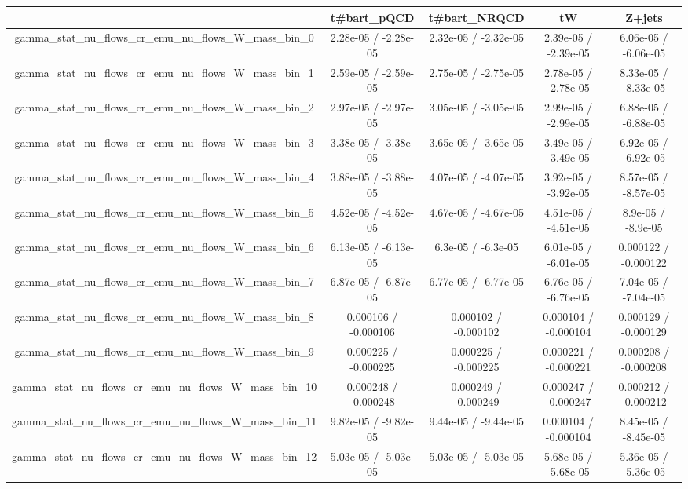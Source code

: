 \documentclass[10pt]{article}
\begin{document}
\begin{table}[htbp]
\begin{center}
\begin{tabular}{|c|c|c|c|c|}
\hline 
      & t#bar{t}_{pQCD}      & t#bar{t}_{NRQCD}      & tW      & Z+jets \\ 
\hline 
  gamma_stat_nu_flows_cr_emu_nu_flows_W_mass_bin_0 & 2.28e-05 / -2.28e-05 & 2.32e-05 / -2.32e-05 & 2.39e-05 / -2.39e-05 & 6.06e-05 / -6.06e-05 \\ 
  gamma_stat_nu_flows_cr_emu_nu_flows_W_mass_bin_1 & 2.59e-05 / -2.59e-05 & 2.75e-05 / -2.75e-05 & 2.78e-05 / -2.78e-05 & 8.33e-05 / -8.33e-05 \\ 
  gamma_stat_nu_flows_cr_emu_nu_flows_W_mass_bin_2 & 2.97e-05 / -2.97e-05 & 3.05e-05 / -3.05e-05 & 2.99e-05 / -2.99e-05 & 6.88e-05 / -6.88e-05 \\ 
  gamma_stat_nu_flows_cr_emu_nu_flows_W_mass_bin_3 & 3.38e-05 / -3.38e-05 & 3.65e-05 / -3.65e-05 & 3.49e-05 / -3.49e-05 & 6.92e-05 / -6.92e-05 \\ 
  gamma_stat_nu_flows_cr_emu_nu_flows_W_mass_bin_4 & 3.88e-05 / -3.88e-05 & 4.07e-05 / -4.07e-05 & 3.92e-05 / -3.92e-05 & 8.57e-05 / -8.57e-05 \\ 
  gamma_stat_nu_flows_cr_emu_nu_flows_W_mass_bin_5 & 4.52e-05 / -4.52e-05 & 4.67e-05 / -4.67e-05 & 4.51e-05 / -4.51e-05 & 8.9e-05 / -8.9e-05 \\ 
  gamma_stat_nu_flows_cr_emu_nu_flows_W_mass_bin_6 & 6.13e-05 / -6.13e-05 & 6.3e-05 / -6.3e-05 & 6.01e-05 / -6.01e-05 & 0.000122 / -0.000122 \\ 
  gamma_stat_nu_flows_cr_emu_nu_flows_W_mass_bin_7 & 6.87e-05 / -6.87e-05 & 6.77e-05 / -6.77e-05 & 6.76e-05 / -6.76e-05 & 7.04e-05 / -7.04e-05 \\ 
  gamma_stat_nu_flows_cr_emu_nu_flows_W_mass_bin_8 & 0.000106 / -0.000106 & 0.000102 / -0.000102 & 0.000104 / -0.000104 & 0.000129 / -0.000129 \\ 
  gamma_stat_nu_flows_cr_emu_nu_flows_W_mass_bin_9 & 0.000225 / -0.000225 & 0.000225 / -0.000225 & 0.000221 / -0.000221 & 0.000208 / -0.000208 \\ 
  gamma_stat_nu_flows_cr_emu_nu_flows_W_mass_bin_10 & 0.000248 / -0.000248 & 0.000249 / -0.000249 & 0.000247 / -0.000247 & 0.000212 / -0.000212 \\ 
  gamma_stat_nu_flows_cr_emu_nu_flows_W_mass_bin_11 & 9.82e-05 / -9.82e-05 & 9.44e-05 / -9.44e-05 & 0.000104 / -0.000104 & 8.45e-05 / -8.45e-05 \\ 
  gamma_stat_nu_flows_cr_emu_nu_flows_W_mass_bin_12 & 5.03e-05 / -5.03e-05 & 5.03e-05 / -5.03e-05 & 5.68e-05 / -5.68e-05 & 5.36e-05 / -5.36e-05 \\ 

\end{tabular}
\end{center}
\end{table}
\end{document}
